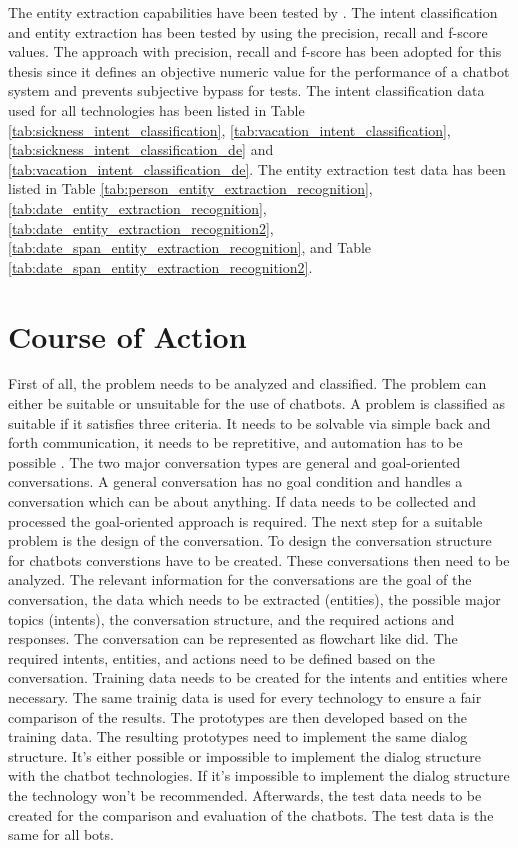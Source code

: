 The entity extraction capabilities have been tested by \citet{geyer2016named}.
The intent classification and entity extraction has been tested by \citet{braunEvaluatingNLU} 
using the precision, recall and f-score values.
The approach with precision, recall and f-score has been adopted for this thesis 
since it defines an objective numeric value for the performance of a chatbot system 
and prevents subjective bypass for tests.
The intent classification data used for all technologies has been listed in Table \ref{tab:sickness_intent_classification},
\ref{tab:vacation_intent_classification}, \ref{tab:sickness_intent_classification_de} and \ref{tab:vacation_intent_classification_de}.
The entity extraction test data has been listed in Table \ref{tab:person_entity_extraction_recognition}, 
\ref{tab:date_entity_extraction_recognition}, \ref{tab:date_entity_extraction_recognition2}, 
\ref{tab:date_span_entity_extraction_recognition}, and Table \ref{tab:date_span_entity_extraction_recognition2}.





\section{Course of Action} %
First of all, the problem needs to be analyzed and classified.
The problem can either be suitable or unsuitable for the use of chatbots.
A problem is classified as suitable if it satisfies three criteria. 
It needs to be solvable via simple back and forth communication,
it needs to be repretitive, and automation has to be possible \citet{singhbuilding}.
The two major conversation types are general and goal-oriented conversations.
A general conversation has no goal condition and handles a conversation which can be 
about anything. 
If data needs to be collected and processed the goal-oriented approach is required.
The next step for a suitable problem is the design of the conversation.
To design the conversation structure for chatbots converstions have to be created.
These conversations then need to be analyzed.
The relevant information for the conversations are the goal of the conversation, the 
data which needs to be extracted (entities), the possible major topics (intents), 
the conversation structure, and the required actions and responses.
The conversation can be represented as flowchart like \citet{singhbuilding} did.
The required intents, entities, and actions need to be defined based on the conversation.
Training data needs to be created for the intents and entities where necessary.
The same trainig data is used for every technology to ensure a fair 
comparison of the results.
The prototypes are then developed based on the training data.
The resulting prototypes need to implement the same dialog structure.
It's either possible or impossible to implement the dialog structure with the 
chatbot technologies. 
If it's impossible to implement the dialog structure the technology 
won't be recommended.
Afterwards, the test data needs to be created for the comparison and evaluation of 
the chatbots.
The test data is the same for all bots.

